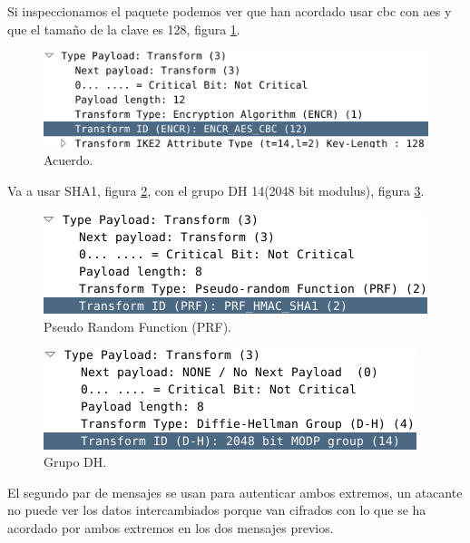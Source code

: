 \documentclass[11pt]{article}
\begin{document}
    \bigskip
    \par
    Si inspeccionamos el paquete podemos ver que han acordado usar cbc con aes
    y que el tamaño de la clave es 128, figura \ref{fig:alg}.

    \begin{figure}[H]
      \centering
      \includegraphics[width = \textwidth]{alg}
      \caption{Acuerdo.}
      \label{fig:alg}
    \end{figure}

    \par
    Va a usar SHA1, figura \ref{fig:prf}, con el grupo DH 14(2048 bit modulus),
    figura \ref{fig:dh}.

    \begin{figure}[H]
      \centering
      \includegraphics[width = \textwidth]{prf}
      \caption{Pseudo Random Function (PRF).}
      \label{fig:prf}
    \end{figure}

    \begin{figure}[H]
      \centering
      \includegraphics[width = \textwidth]{dh}
      \caption{Grupo DH.}
      \label{fig:dh}
    \end{figure}

    \par
    El segundo par de mensajes se usan para autenticar ambos extremos, un
    atacante no puede ver los datos intercambiados porque van cifrados con lo
    que se ha acordado por ambos extremos en los dos mensajes previos.
\end{document}
